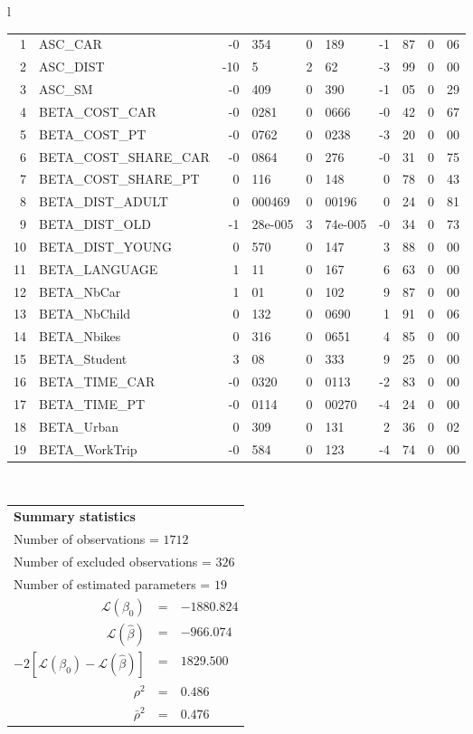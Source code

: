 \begin{tabular}{l}
\begin{tabular}{rlr@{.}lr@{.}lr@{.}lr@{.}l}
1 & ASC_CAR & -0&354 & 0&189 & -1&87 & 0&06\\
2 & ASC_DIST & -10&5 & 2&62 & -3&99 & 0&00\\
3 & ASC_SM & -0&409 & 0&390 & -1&05 & 0&29\\
4 & BETA_COST_CAR & -0&0281 & 0&0666 & -0&42 & 0&67\\
5 & BETA_COST_PT & -0&0762 & 0&0238 & -3&20 & 0&00\\
6 & BETA_COST_SHARE_CAR & -0&0864 & 0&276 & -0&31 & 0&75\\
7 & BETA_COST_SHARE_PT & 0&116 & 0&148 & 0&78 & 0&43\\
8 & BETA_DIST_ADULT & 0&000469 & 0&00196 & 0&24 & 0&81\\
9 & BETA_DIST_OLD & -1&28e-005 & 3&74e-005 & -0&34 & 0&73\\
10 & BETA_DIST_YOUNG & 0&570 & 0&147 & 3&88 & 0&00\\
11 & BETA_LANGUAGE & 1&11 & 0&167 & 6&63 & 0&00\\
12 & BETA_NbCar & 1&01 & 0&102 & 9&87 & 0&00\\
13 & BETA_NbChild & 0&132 & 0&0690 & 1&91 & 0&06\\
14 & BETA_Nbikes & 0&316 & 0&0651 & 4&85 & 0&00\\
15 & BETA_Student & 3&08 & 0&333 & 9&25 & 0&00\\
16 & BETA_TIME_CAR & -0&0320 & 0&0113 & -2&83 & 0&00\\
17 & BETA_TIME_PT & -0&0114 & 0&00270 & -4&24 & 0&00\\
18 & BETA_Urban & 0&309 & 0&131 & 2&36 & 0&02\\
19 & BETA_WorkTrip & -0&584 & 0&123 & -4&74 & 0&00\\
\hline
\end{tabular}
\\
\begin{tabular}{rcl}
\multicolumn{3}{l}{\bf Summary statistics}\\
\multicolumn{3}{l}{ Number of observations = $1712$} \\
\multicolumn{3}{l}{ Number of excluded observations = $326$} \\
\multicolumn{3}{l}{ Number of estimated  parameters = $19$} \\
 $\mathcal{L}(\beta_0)$ &=&  $-1880.824$ \\
 $\mathcal{L}(\hat{\beta})$ &=& $-966.074 $  \\
 $-2[\mathcal{L}(\beta_0) -\mathcal{L}(\hat{\beta})]$ &=& $1829.500$ \\
    $\rho^2$ &=&   $0.486$ \\
    $\bar{\rho}^2$ &=&    $0.476$ \\
\end{tabular}
  \end{tabular}
